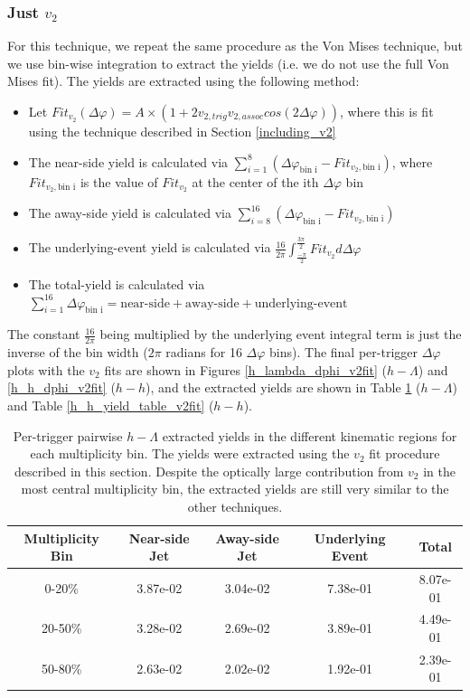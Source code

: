 \documentclass[ALICE,manyauthors]{ALICE_analysis_notes}
\begin{document}
\clearpage


\subsubsection{Just $v_{2}$}
\label{v2_background_technique}
For this technique, we repeat the same procedure as the Von Mises technique, but we use bin-wise integration to extract the yields (i.e. we do not use the full Von Mises fit). The yields are extracted using the following method:

\begin{itemize}
\item Let $Fit_{v_{2}}(\Delta\varphi) = A\times(1 + 2v_{2, trig}v_{2, assoc}cos(2\Delta\varphi))$, where this is fit using the technique described in Section \ref{including_v2}
\item The near-side yield is calculated via $\sum_{i=1}^{8} (\Delta\varphi_\text{bin i} - Fit_{v_{2}, \text{bin i}})$, where $Fit_{v_{2}, \text{bin i}}$ is the value of $Fit_{v_{2}}$ at the center of the ith $\Delta\varphi$ bin
\item The away-side yield is calculated via $\sum_{i=8}^{16} (\Delta\varphi_\text{bin i} - Fit_{v_{2}, \text{bin i}})$
\item The underlying-event yield is calculated via $\frac{16}{2\pi}\int_{\frac{-\pi}{2}}^{\frac{3\pi}{2}} Fit_{v_{2}} d\Delta\varphi$
\item The total-yield is calculated via $\sum_{i=1}^{16} \Delta\varphi_\text{bin i} = \text{near-side} + \text{away-side} + \text{underlying-event}$
\end{itemize}

The constant $\frac{16}{2\pi}$ being multiplied by the underlying event integral term is just the inverse of the bin width ($2\pi$ radians for 16 $\Delta\varphi$ bins). The final per-trigger $\Delta\varphi$ plots with the $v_{2}$ fits are shown in Figures \ref{h_lambda_dphi_v2fit} ($h-\Lambda$) and \ref{h_h_dphi_v2fit} ($h-h$), and the extracted yields are shown in Table \ref{h_lambda_yield_table_v2fit} ($h-\Lambda$) and Table \ref{h_h_yield_table_v2fit} ($h-h$). 

\begin{table}[h!]
\centering
\begin{tabular}{| c || c | c | c | c | }
\hline
Multiplicity Bin & Near-side Jet & Away-side Jet & Underlying Event & Total  \\
\hline
0-20\% & 3.87e-02  & 3.04e-02  & 7.38e-01 & 8.07e-01 \\
20-50\% & 3.28e-02 & 2.69e-02  & 3.89e-01 & 4.49e-01 \\
50-80\% & 2.63e-02 & 2.02e-02  & 1.92e-01 & 2.39e-01 \\
\hline
\end{tabular}
\caption{Per-trigger pairwise $h-\Lambda$ extracted yields in the different kinematic regions for each multiplicity bin. The yields were extracted using the $v_{2}$ fit procedure described in this section. Despite the optically large contribution from $v_{2}$ in the most central multiplicity bin, the extracted yields are still very similar to the other techniques.}
\label{h_lambda_yield_table_v2fit}
\end{table}
\end{document}
